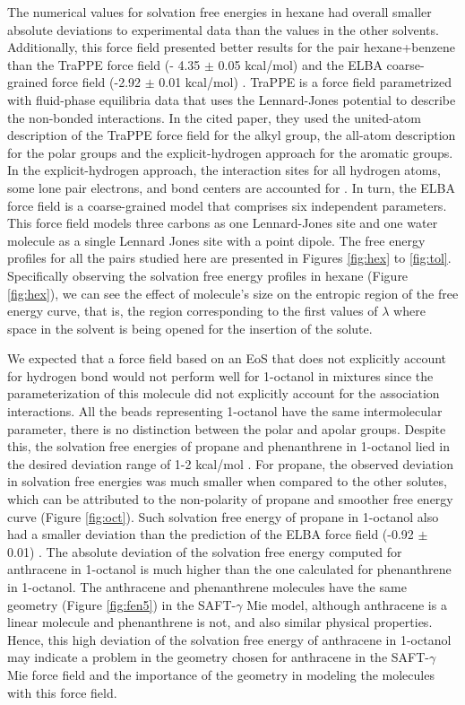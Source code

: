 The numerical values for solvation free energies in hexane had overall smaller absolute deviations to experimental data than the values in the other solvents. Additionally, this force field presented better results for the pair hexane+benzene than the TraPPE force field (- 4.35  $\pm$ 0.05 kcal/mol) \cite{garrido2011} and the ELBA coarse-grained force field  (-2.92 $\pm$ 0.01 kcal/mol) \cite{doi:10.1021/acs.jctc.5b00963}. TraPPE is a force field parametrized with fluid-phase equilibria data that uses the Lennard-Jones potential to describe the non-bonded interactions. In the cited paper, they used the united-atom description of the TraPPE force field for the alkyl group, the all-atom description for the polar groups and the explicit-hydrogen approach for the aromatic groups. In the explicit-hydrogen approach, the interaction sites for all hydrogen atoms, some lone pair electrons, and bond centers are accounted for \cite{doi:10.1021/jp073586l}. In turn, the ELBA force field is a coarse-grained model that comprises six independent parameters. This force field models three carbons as one Lennard-Jones site and one water molecule as a single Lennard Jones site with a point dipole. The free energy profiles for all the pairs studied here are presented in Figures \ref{fig:hex} to \ref{fig:tol}. Specifically observing the solvation free energy profiles in hexane (Figure \ref{fig:hex}), we can see the effect of molecule's size on the entropic region of the free energy curve, that is, the region corresponding to the first values of $\lambda$ where space in the solvent is being opened for the insertion of the solute.

We expected that a force field based on an EoS that does not explicitly account for hydrogen bond would not perform well for 1-octanol in mixtures since the parameterization of this molecule did not explicitly account for the association interactions. All the beads representing 1-octanol have the same intermolecular parameter, there is no distinction between the polar and apolar groups. Despite this, the solvation free energies of propane and phenanthrene in 1-octanol lied in the desired deviation range of 1-2 kcal/mol \cite{doimobley}. For propane, the observed deviation in solvation free energies was much smaller when compared to the other solutes, which can be attributed to the non-polarity of propane and smoother free energy curve (Figure \ref{fig:oct}). Such solvation free energy of propane in 1-octanol also had a smaller deviation than the prediction of the ELBA force field (-0.92 $\pm$ 0.01) \cite{doi:10.1021/acs.jctc.5b00963}. The absolute deviation of the solvation free energy computed for anthracene in 1-octanol is much higher than the one calculated for phenanthrene in 1-octanol. The anthracene and phenanthrene molecules have the same geometry (Figure \ref{fig:fen5}) in the SAFT-$\gamma$ Mie model, although anthracene is a linear molecule and phenanthrene is not, and also similar physical properties. Hence, this high deviation of the solvation free energy of anthracene in 1-octanol may indicate a problem in the geometry chosen for anthracene in the SAFT-$\gamma$ Mie force field and the importance of the geometry in modeling the molecules with this force field.      

